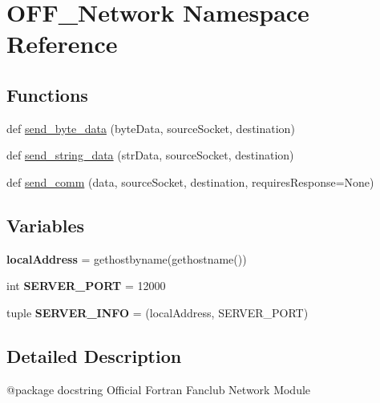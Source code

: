 \hypertarget{namespace_o_f_f___network}{}\section{O\+F\+F\+\_\+\+Network Namespace Reference}
\label{namespace_o_f_f___network}
\subsection*{Functions}
\begin{DoxyCompactItemize}
\item 
def \hyperlink{namespace_o_f_f___network_a0ab8439ad8255392538b5966e5168506}{send\+\_\+byte\+\_\+data} (byte\+Data, source\+Socket, destination)
\item 
def \hyperlink{namespace_o_f_f___network_ad4c88e602c445d2b5a4a32564decf49c}{send\+\_\+string\+\_\+data} (str\+Data, source\+Socket, destination)
\item 
def \hyperlink{namespace_o_f_f___network_a07ee3bf5d20771b38ba37bc09a63988b}{send\+\_\+comm} (data, source\+Socket, destination, requires\+Response=None)
\end{DoxyCompactItemize}
\subsection*{Variables}
\begin{DoxyCompactItemize}
\item 
\mbox{\label{namespace_o_f_f___network_adffdd99674fb44304159889e45506b8b}} 
{\bfseries local\+Address} = gethostbyname(gethostname())
\item 
\mbox{\label{namespace_o_f_f___network_ad86d6e025f98f77f2513ed47b6a9c9ed}} 
int {\bfseries S\+E\+R\+V\+E\+R\+\_\+\+P\+O\+RT} = 12000
\item 
\mbox{\label{namespace_o_f_f___network_a983ac01abcf0c3b7e474984e7ece31b7}} 
tuple {\bfseries S\+E\+R\+V\+E\+R\+\_\+\+I\+N\+FO} = (local\+Address, S\+E\+R\+V\+E\+R\+\_\+\+P\+O\+RT)
\end{DoxyCompactItemize}


\subsection{Detailed Description}
\begin{DoxyVerb}@package docstring
Official Fortran Fanclub Network Module\end{DoxyVerb}
 


